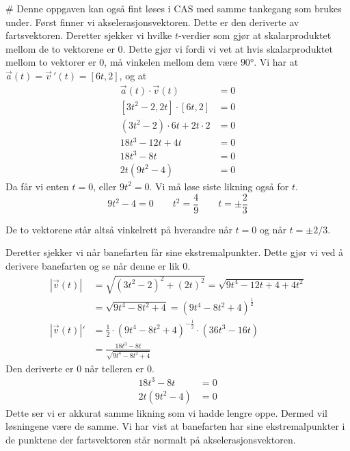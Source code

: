 \begin{easylist}[enumerate]
	# Denne oppgaven kan også fint løses i CAS med samme tankegang som brukes under. 
	Først finner vi akselerasjonsvektoren. 
	Dette er den deriverte av fartsvektoren. 
	Deretter sjekker vi hvilke $t$-verdier som gjør at skalarproduktet mellom de to vektorene er $0$. 
	Dette gjør vi fordi vi vet at hvis skalarproduktet mellom to vektorer er 0, må vinkelen mellom dem være $\ang{90}$.
	Vi har at $\vec{a}(t)  = \vec{v} \, '(t)  = [6t,2]$, og at
	\begin{align*}
			\vec{a}(t) \cdot \vec{v}(t) &= 0 \\
			[3t^2 -2,2t] \cdot [6t,2] & = 0 \\
			(3t^2 - 2) \cdot 6t + 2t \cdot 2  & = 0\\
			18t^3 - 12t + 4t & = 0 \\
			18t^3 - 8t & = 0 \\
			2t(9t^2 -4) & = 0 
	\end{align*}
	Da får vi enten $t = 0$, eller $9t^2 = 0$. 
	Vi må løse siste likning også for $t$.
	\begin{equation*}
			9t^2 -4  = 0 \qquad
			t^2  = \frac{4}{9} \qquad
			t = \pm \frac{2}{3}
	\end{equation*}
		
	De to vektorene står altså vinkelrett på hverandre når $t = 0$ og når $t = \pm 2/3$.
		
	Deretter sjekker vi når banefarten får sine ekstremalpunkter. Dette gjør vi ved å derivere banefarten og se når denne er lik 0.
		\begin{align*}
	|\vec{v}(t)| & = \sqrt{(3t^2 - 2)^2 + (2t)^2} 
	= \sqrt{9t^4 - 12t + 4 +4t^2} \\
				 & = \sqrt{9t^4 - 8t^2 + 4} = (9t^4 - 8t^2 + 4)^{\frac{1}{2}} \\
|\vec{v}(t)| '   &= \frac{1}{2} \cdot (9t^4 - 8t^2 + 4)^{-\frac{1}{2}} \cdot (36t^3 -16t) \\
				 & = \frac{18t^3 - 8t}{\sqrt{9t^4 - 8t^2 + 4}} 
		\end{align*}
		Den deriverte er 0 når telleren er 0.
		\begin{align*}
				18t^3 - 8t & = 0 \\
				2t(9t^2 -4) & = 0 
		\end{align*}
		Dette ser vi er akkurat samme likning som vi hadde lengre oppe. 
		Dermed vil løsningene være de samme. 
		Vi har vist at banefarten har sine ekstremalpunkter i de punktene der fartsvektoren står normalt på akselerasjonsvektoren.
		
\end{easylist}
